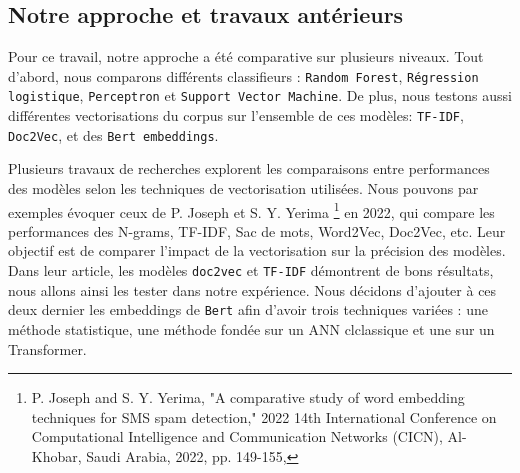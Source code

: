 \subsection{Notre approche et travaux antérieurs}

Pour ce travail, notre approche a été comparative sur plusieurs niveaux. Tout d'abord, nous comparons différents classifieurs : \texttt{Random Forest}, \texttt{Régression logistique}, \texttt{Perceptron} et \texttt{Support Vector Machine}. De plus, nous testons aussi différentes vectorisations du corpus sur l'ensemble de ces modèles: \texttt{TF-IDF}, \texttt{Doc2Vec}, et des \texttt{Bert embeddings}.


\par Plusieurs travaux de recherches explorent les comparaisons entre performances des modèles selon les techniques de vectorisation utilisées. Nous pouvons par exemples évoquer ceux de P. Joseph et S. Y. Yerima \footnote{P. Joseph and S. Y. Yerima, "A comparative study of word embedding techniques for SMS spam detection," 2022 14th International Conference on Computational Intelligence and Communication Networks (CICN), Al-Khobar, Saudi Arabia, 2022, pp. 149-155,} en 2022, qui compare les performances des N-grams, TF-IDF, Sac de mots, Word2Vec, Doc2Vec, etc. Leur objectif est de comparer l'impact de la vectorisation sur la précision des modèles. Dans leur article, les modèles \texttt{doc2vec} et \texttt{TF-IDF} démontrent de bons résultats, nous allons ainsi les tester dans notre expérience. Nous décidons d'ajouter à ces deux dernier les embeddings de \texttt{Bert} afin d'avoir trois techniques variées : une méthode statistique, une méthode fondée sur un ANN clclassique et une sur un Transformer.
